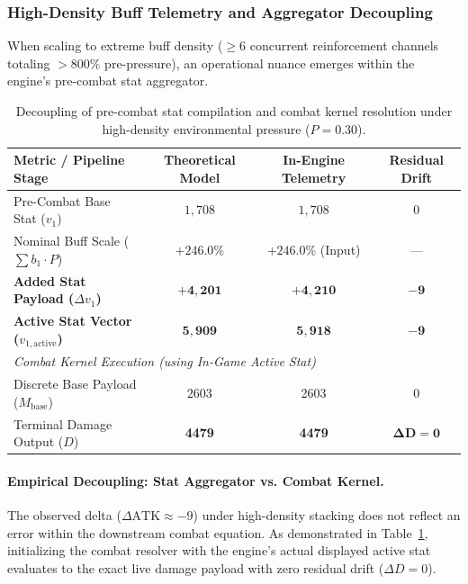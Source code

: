 \documentclass[twocolumn,10pt]{article}
\begin{document}
\subsubsection{High-Density Buff Telemetry and Aggregator Decoupling}
When scaling to extreme buff density ($\ge 6$ concurrent reinforcement channels totaling $>800\%$ pre-pressure), an operational nuance emerges within the engine's pre-combat stat aggregator.

\begin{table}[H]
\centering
\small
\setlength{\tabcolsep}{6pt}
\begin{tabular}{lccc}
\toprule
\textbf{Metric / Pipeline Stage} & \textbf{Theoretical Model} & \textbf{In-Engine Telemetry} & \textbf{Residual Drift} \\
\midrule
Pre-Combat Base Stat ($v_1$)            & $1,708$            & $1,708$            & $0$ \\
Nominal Buff Scale ($\sum b_1 \cdot P$) & $+246.0\%$         & $+246.0\%$ (Input) & --- \\
\textbf{Added Stat Payload ($\Delta v_1$)} & $\mathbf{+4,201}$ & $\mathbf{+4,210}$ & $\mathbf{-9}$ \\
\textbf{Active Stat Vector ($v_{1,\text{active}}$)} & $\mathbf{5,909}$ & $\mathbf{5,918}$ & $\mathbf{-9}$ \\
\midrule
\multicolumn{4}{l}{\textit{Combat Kernel Execution (using In-Game Active Stat)}} \\
Discrete Base Payload ($M_{\text{base}}$) & $2603$ & 2603 & 0 \\
Terminal Damage Output ($D$)             & \textbf{4479} & \textbf{4479} & $\mathbf{\Delta D = 0}$ \\
\bottomrule
\end{tabular}
\caption{Decoupling of pre-combat stat compilation and combat kernel resolution under high-density environmental pressure ($P = 0.30$).}
\label{tab:pressure_high_density}
\end{table}

\paragraph{Empirical Decoupling: Stat Aggregator vs. Combat Kernel.}
The observed delta ($\Delta \text{ATK} \approx -9$) under high-density stacking does not reflect an error within the downstream combat equation. As demonstrated in Table~\ref{tab:pressure_high_density}, initializing the combat resolver with the engine's actual displayed active stat evaluates to the exact live damage payload with zero residual drift ($\Delta D = 0$). 
\end{document}
